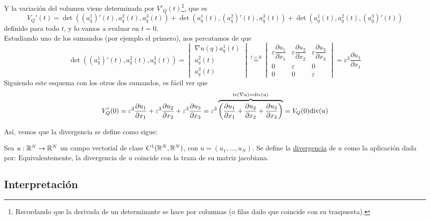 Y la variación del volumen viene determinada por $V'_Q(t)$\footnote{Recordando que la derivada de un determinante se hace
por columnas (o filas dado que coincide con su traspuesta).}, que es
$$V_Q'(t) = \det((a_q^1)'(t), a_q^2(t), a_q^3(t)) + \det(a_q^1(t), (a_q^2)'(t), a_q^3(t)) + 
\det(a_q^1(t), a_q^2(t), (a_q^3)'(t))$$ definido para todo $t$, y lo vamos a evaluar en $t=0$. \\

Estudiando uno de los sumandos (por ejemplo el primero), nos percatamos de que 
$$\det((a_q^1)'(t), a_q^2(t), a_q^3(t)) = \begin{vmatrix}
    \nabla u (q) a_q^1(t) \\
    a_q^2(t) \\
    a_q^3(t)
\end{vmatrix} \stackrel{t=0}{=} \begin{vmatrix}
    \varepsilon \dfrac{\partial u_1}{\partial x_1} & \varepsilon \dfrac{\partial u_2}{\partial x_2} & \varepsilon \dfrac{\partial u_3}{\partial x_3} \\
    0 & \varepsilon & 0 \\
    0 & 0 & \varepsilon
\end{vmatrix} = \varepsilon^3 \dfrac{\partial u_1}{\partial x_1}$$
Siguiendo este esquema con los otros dos sumandos, es fácil ver que 
$$V_Q'(0) = \varepsilon^3 \dfrac{\partial u_1}{\partial x_1} + \varepsilon^3 \dfrac{\partial u_2}{\partial x_2} + \varepsilon^3 \dfrac{\partial u_3}{\partial x_3} = 
\varepsilon^3 \overbrace{\left( \dfrac{\partial u_1}{\partial x_1} + \dfrac{\partial u_2}{\partial x_2} + \dfrac{\partial u_3}{\partial x_3} \right)}^{\text{tr}(\nabla u) = \text{div}(u)} = 
V_Q(0) \text{div}(u)$$

Así, vemos que la divergencia se define como sigue:
\begin{definicion}
    Sea $u : \mathbb{R}^N \to \mathbb{R}^N$ un campo vectorial de clase $C^1(\mathbb{R}^N, \mathbb{R}^N)$, con $u = (u_1, \ldots, u_N)$. Se define la \underline{divergencia} de $u$ 
    como la aplicación dada por:
    Equivalentemente, la divergencia de $u$ coincide con la traza de su matriz jacobiana.
\end{definicion}

\subsection{Interpretación}
\label{t1:interpretación}

